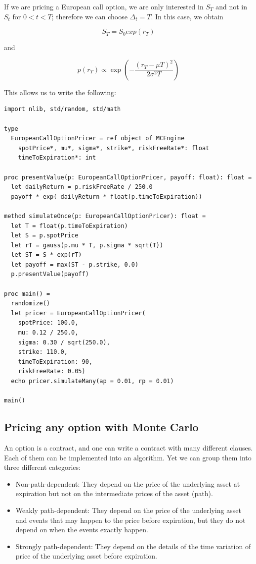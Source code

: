 \documentclass[justified, sixbynine]{tufte-book}
\def\ft{\small\tt}
\theoremstyle{plain}%
\newtheorem * {corollary}{Corollary}
\theoremstyle{definition}
\theoremstyle{remark}
\newtheorem * {remark}{Remark}
\newtheorem * {note}{Note}
\begin{document}
\begin{fullwidth}
If we are pricing a European call option, we are only interested in $S_T$ and not in $S_t$ for $0<t<T$; therefore we can choose $\Delta_t = T$. In this case, we obtain

\begin{equation}
S_T = S_0 exp(r_T)
\end{equation}

and

\begin{equation}
p(r_T) \propto \exp\left(-\frac{(r_T-\mu T)^2}{2\sigma^2 T}\right)
\end{equation}

This allows us to write the following:

\begin{lstlisting}[caption={in file: {\ft options.nim}}]
import nlib, std/random, std/math

type
  EuropeanCallOptionPricer = ref object of MCEngine
    spotPrice*, mu*, sigma*, strike*, riskFreeRate*: float
    timeToExpiration*: int

proc presentValue(p: EuropeanCallOptionPricer, payoff: float): float =
  let dailyReturn = p.riskFreeRate / 250.0
  payoff * exp(-dailyReturn * float(p.timeToExpiration))

method simulateOnce(p: EuropeanCallOptionPricer): float =
  let T = float(p.timeToExpiration)
  let S = p.spotPrice
  let rT = gauss(p.mu * T, p.sigma * sqrt(T))
  let ST = S * exp(rT)
  let payoff = max(ST - p.strike, 0.0)
  p.presentValue(payoff)

proc main() =
  randomize()
  let pricer = EuropeanCallOptionPricer(
    spotPrice: 100.0,
    mu: 0.12 / 250.0,
    sigma: 0.30 / sqrt(250.0),
    strike: 110.0,
    timeToExpiration: 90,
    riskFreeRate: 0.05)
  echo pricer.simulateMany(ap = 0.01, rp = 0.01)

main()
\end{lstlisting}

\goodbreak\subsection{Pricing any option with Monte Carlo}

An option is a contract, and one can write a contract with many different clauses. Each of them can be implemented into an algorithm. Yet we can group them into three different categories:
\begin{itemize}
\item Non-path-dependent: They depend on the price of the underlying asset at expiration but not on the intermediate prices of the asset (path).
\item Weakly path-dependent: They depend on the price of the underlying asset and events that may happen to the price before expiration, but they do not depend on when the events exactly happen.
\item Strongly path-dependent: They depend on the details of the time variation of price of the underlying asset before expiration.
\end{itemize}


\end{fullwidth}
\end{document}
